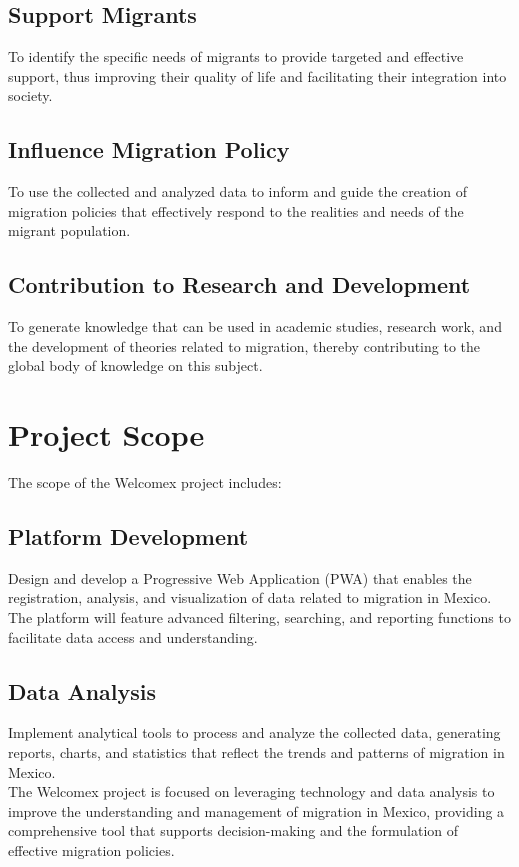 \documentclass[conference]{IEEEtran}
\begin{document}
\subsection{Support Migrants}
To identify the specific needs of migrants to provide targeted and effective support, thus improving their quality of life and facilitating their integration into society.

\subsection{Influence Migration Policy}
To use the collected and analyzed data to inform and guide the creation of migration policies that effectively respond to the realities and needs of the migrant population.

\subsection{Contribution to Research and Development}
To generate knowledge that can be used in academic studies, research work, and the development of theories related to migration, thereby contributing to the global body of knowledge on this subject.
\newpage
\section{Project Scope}
The scope of the Welcomex project includes:

\subsection{Platform Development}
Design and develop a Progressive Web Application (PWA) that enables the registration, analysis, and visualization of data related to migration in Mexico. The platform will feature advanced filtering, searching, and reporting functions to facilitate data access and understanding.

\subsection{Data Analysis}
Implement analytical tools to process and analyze the collected data, generating reports, charts, and statistics that reflect the trends and patterns of migration in Mexico.
\\

The Welcomex project is focused on leveraging technology and data analysis to improve the understanding and management of migration in Mexico, providing a comprehensive tool that supports decision-making and the formulation of effective migration policies.
\end{document}
